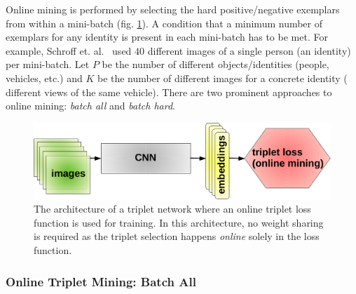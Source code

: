 Online mining is performed by selecting the hard positive/negative exemplars from within a mini-batch (fig. \ref{fig:TripletArchitectureOnlineMining}). A condition that a minimum number of exemplars for any identity is present in each mini-batch has to be met. For example, Schroff et. al.~\cite{schroff2015facenet} used $40$ different images of a single person (an identity) per mini-batch. Let $P$ be the number of different objects/identities (people, vehicles, etc.) and $K$ be the number of different images for a concrete identity (\egtext{} different views of the same vehicle). There are two prominent approaches to online mining: \emph{batch all} and \emph{batch hard}.

\begin{figure}[t]
    \centerline{\includegraphics[width=0.5\linewidth]{figures/theoretical_foundations/triplet_architecture_online_mining.pdf}}
    \caption[Triplet loss online mining architecture]{The architecture of a triplet network where an online triplet loss function is used for training. In this architecture, no weight sharing is required as the triplet selection happens \emph{online} solely in the loss function.}
    \label{fig:TripletArchitectureOnlineMining}
\end{figure}

\subsubsection{Online Triplet Mining: Batch All}


